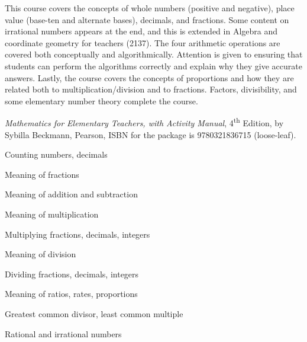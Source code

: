\documentclass{osucourse}
\begin{document}
\CatalogDescription
\PrerequisitesAndExclusions

\begin{Purpose}
This course covers the concepts of whole numbers (positive and negative), place value (base-ten and alternate bases), decimals, and fractions. Some content on irrational numbers appears at the end, and this is extended in Algebra and coordinate geometry for teachers (2137). The four arithmetic operations are covered both conceptually and algorithmically. Attention is given to ensuring that students can perform the algorithms correctly and explain why they give accurate answers. Lastly, the course covers the concepts of proportions and how they are related both to multiplication/division and to fractions. Factors, divisibility, and some elementary number theory complete the course.
\end{Purpose}

\begin{Text}
\emph{Mathematics for Elementary Teachers, with Activity Manual}, 4\textsuperscript{th} Edition, by Sybilla Beckmann, Pearson, ISBN for the package is 9780321836715 (loose-leaf).
\end{Text}

\begin{TopicsList}
\item Counting numbers, decimals
\item Meaning of fractions
\item Meaning of addition and subtraction
\item Meaning of multiplication
\item Multiplying fractions, decimals, integers
\item Meaning of division
\item Dividing fractions, decimals, integers
\item Meaning of ratios, rates, proportions
\item Greatest common divisor, least common multiple
\item Rational and irrational numbers
\end{TopicsList}
\end{document}
